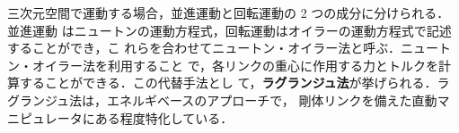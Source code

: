 

三次元空間で運動する場合，並進運動と回転運動の 2 つの成分に分けられる．並進運動
はニュートンの運動方程式，回転運動はオイラーの運動方程式で記述することができ，こ
れらを合わせてニュートン・オイラー法と呼ぶ．ニュートン・オイラー法を利用すること
で，各リンクの重心に作用する力とトルクを計算することができる．この代替手法とし
て，\textbf{ラグランジュ法}が挙げられる．ラグランジュ法は，エネルギベースのアプローチで，
剛体リンクを備えた直動マニピュレータにある程度特化している．
\newpage
